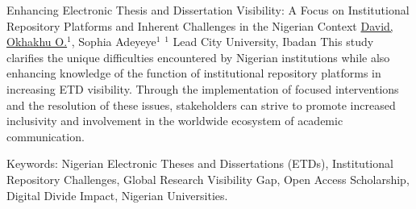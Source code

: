 \begin{abstract_online}{Enhancing Electronic Thesis and Dissertation Visibility: A Focus on Institutional Repository Platforms and Inherent Challenges in the Nigerian Context}{%
        \underline{David, Okhakhu O.}$^{1}$, Sophia Adeyeye$^{1}$}{%
        }{%
        $^1$ Lead City University, Ibadan}
    This study clarifies the unique difficulties encountered by Nigerian institutions while also enhancing knowledge of the function of institutional repository platforms in increasing ETD visibility. Through the implementation of focused interventions and the resolution of these issues, stakeholders can strive to promote increased inclusivity and involvement in the worldwide ecosystem of academic communication. 

    Keywords: Nigerian Electronic Theses and Dissertations (ETDs), Institutional Repository Challenges, Global Research Visibility Gap, Open Access Scholarship, Digital Divide Impact, Nigerian Universities.
\end{abstract_online}

